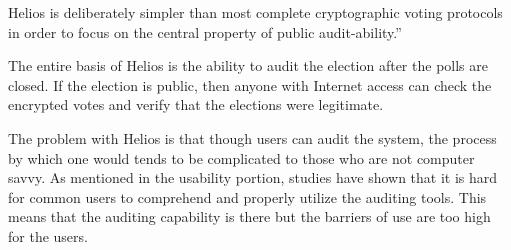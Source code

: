 Helios is deliberately simpler than most complete cryptographic voting protocols in order to focus on the central property of public audit-ability.''~\cite{adida2008}

The entire basis of Helios is the ability to audit the election after the polls are closed. If the election is public, then anyone with Internet access can check the encrypted votes and verify that the elections were legitimate.

The problem with Helios is that though users can audit the system, the process by which one would tends to be complicated to those who are not computer savvy. As mentioned in the usability portion, studies have shown that it is hard for common users to comprehend and properly utilize the auditing tools. This means that the auditing capability is there but the barriers of use are too high for the users.

